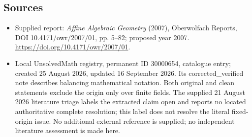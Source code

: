 \documentclass[11pt]{article}
\begin{document}
\subsection{Sources}
\begin{itemize}
\item Supplied report: \emph{Affine Algebraic Geometry} (2007), Oberwolfach Reports, DOI 10.4171/owr/2007/01, pp. 5--82; proposed year 2007. \url{https://doi.org/10.4171/owr/2007/01}.
\item Local UnsolvedMath registry, permanent ID 30000654, catalogue entry; created 25 August 2026, updated 16 September 2026. Its corrected\_verified note describes balancing mathematical notation. Both original and clean statements exclude the origin only over finite fields. The supplied 21 August 2026 literature triage labels the extracted claim open and reports no located authoritative complete resolution; this label does not resolve the literal fixed-origin issue. No additional external reference is supplied; no independent literature assessment is made here.
\end{itemize}
\end{document}
